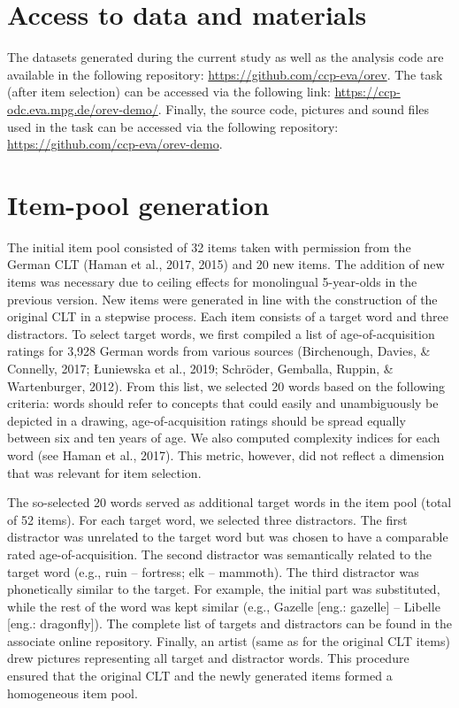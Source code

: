 \documentclass[
  man,floatsintext]{apa6}
\begin{document}
\hypertarget{access-to-data-and-materials}{%
\section{Access to data and materials}\label{access-to-data-and-materials}}

The datasets generated during the current study as well as the analysis code are available in the following repository: \url{https://github.com/ccp-eva/orev}. The task (after item selection) can be accessed via the following link: \url{https://ccp-odc.eva.mpg.de/orev-demo/}. Finally, the source code, pictures and sound files used in the task can be accessed via the following repository: \url{https://github.com/ccp-eva/orev-demo}.

\hypertarget{item-pool-generation}{%
\section{Item-pool generation}\label{item-pool-generation}}

The initial item pool consisted of 32 items taken with permission from the German CLT (Haman et al., 2017, 2015) and 20 new items. The addition of new items was necessary due to ceiling effects for monolingual 5-year-olds in the previous version. New items were generated in line with the construction of the original CLT in a stepwise process. Each item consists of a target word and three distractors. To select target words, we first compiled a list of age-of-acquisition ratings for 3,928 German words from various sources (Birchenough, Davies, \& Connelly, 2017; Łuniewska et al., 2019; Schröder, Gemballa, Ruppin, \& Wartenburger, 2012). From this list, we selected 20 words based on the following criteria: words should refer to concepts that could easily and unambiguously be depicted in a drawing, age-of-acquisition ratings should be spread equally between six and ten years of age. We also computed complexity indices for each word (see Haman et al., 2017). This metric, however, did not reflect a dimension that was relevant for item selection.

The so-selected 20 words served as additional target words in the item pool (total of 52 items). For each target word, we selected three distractors. The first distractor was unrelated to the target word but was chosen to have a comparable rated age-of-acquisition. The second distractor was semantically related to the target word (e.g., ruin -- fortress; elk -- mammoth). The third distractor was phonetically similar to the target. For example, the initial part was substituted, while the rest of the word was kept similar (e.g., Gazelle {[}eng.: gazelle{]} -- Libelle {[}eng.: dragonfly{]}). The complete list of targets and distractors can be found in the associate online repository. Finally, an artist (same as for the original CLT items) drew pictures representing all target and distractor words. This procedure ensured that the original CLT and the newly generated items formed a homogeneous item pool.
\end{document}
